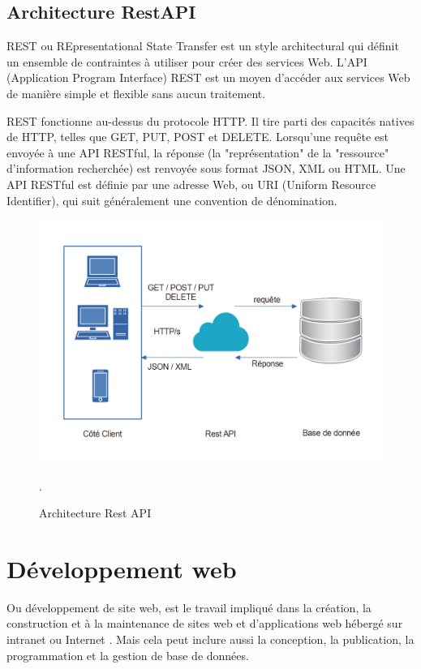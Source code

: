 \subsection{Architecture RestAPI }
\par REST ou REpresentational State Transfer est un style architectural qui
définit un ensemble de contraintes à utiliser pour créer des services Web.
L'API (Application Program Interface) REST est un moyen d'accéder aux services
Web de manière simple et flexible sans aucun traitement.
\par REST fonctionne au-dessus du protocole HTTP. Il tire parti des capacités
natives de HTTP, telles que GET, PUT, POST et DELETE. Lorsqu'une requête est
envoyée à une API RESTful, la réponse (la "représentation" de la "ressource"
d'information recherchée) est renvoyée sous format JSON, XML ou HTML. Une API
RESTful est définie par une adresse Web, ou URI (Uniform Resource Identifier),
qui suit généralement une convention de dénomination.\cite{ref7}
\begin{figure}[H]
\centering
\includegraphics[scale=0.4]{Figures/figure arch restapi.png}
\caption{Architecture Rest API}.
\label{fig:my_label}
\end{figure}
\section{Développement web }
\par Ou développement de site web, est le travail impliqué dans la création, la
construction et à la maintenance de sites web et d’applications web hébergé sur
intranet ou Internet . Mais cela peut inclure aussi la conception, la
publication, la programmation et la gestion de base de données.
